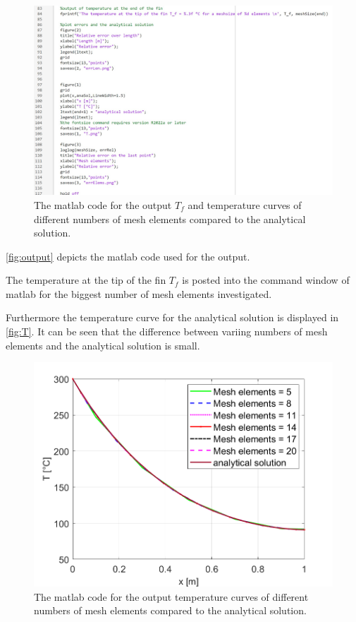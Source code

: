 \begin{figure}[H]
    \centering
    \includegraphics[width=.8\textwidth]{figures/output_figures.jpg}
    \caption{The matlab code for the output $T_f$ and temperature curves of different numbers of mesh elements compared to the analytical solution.}
    \label{fig:output}
\end{figure}

\autoref{fig:output} depicts the matlab code used for the output. 


The temperature at the tip of the fin $T_f$ is posted into the command window of matlab for the biggest number of mesh elements investigated.

Furthermore the temperature curve for the analytical solution is displayed in \autoref{fig:T}. It can be seen that the difference between variing numbers of mesh elements and the analytical solution is small. 

\begin{figure}[H]
    \centering
    \includegraphics[width=.75\textwidth]{figures/T.png}
    \caption{The matlab code for the output temperature curves of different numbers of mesh elements compared to the analytical solution.}
    \label{fig:T}
\end{figure}


















